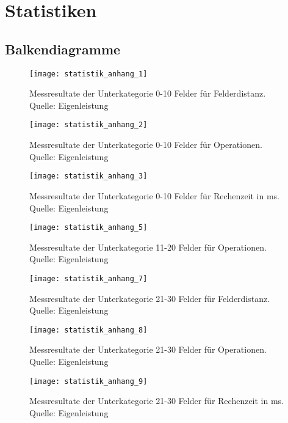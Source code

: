 \section{Statistiken}
\subsection{Balkendiagramme}
\begin{figure}[H]
  \centering
  \texttt{[image: statistik\_anhang\_1]}
  \caption[Messresultate der Unterkategorie 0-10 Felder für Felderdistanz.]{Messresultate der Unterkategorie 0-10 Felder für Felderdistanz. Quelle: Eigenleistung}
\end{figure}
\begin{figure}[H]
  \centering
  \texttt{[image: statistik\_anhang\_2]}
  \caption[Messresultate der Unterkategorie 0-10 Felder für Operationen.]{Messresultate der Unterkategorie 0-10 Felder für Operationen. Quelle: Eigenleistung}
\end{figure}
\begin{figure}[H]
  \centering
  \texttt{[image: statistik\_anhang\_3]}
  \caption[Messresultate der Unterkategorie 0-10 Felder für Rechenzeit in ms.]{Messresultate der Unterkategorie 0-10 Felder für Rechenzeit in ms. Quelle: Eigenleistung}
\end{figure}
\begin{figure}[H]
  \centering
  \texttt{[image: statistik\_anhang\_5]}
  \caption[Messresultate der Unterkategorie 11-20 Felder für Operationen.]{Messresultate der Unterkategorie 11-20 Felder für Operationen. Quelle: Eigenleistung}
\end{figure}
\begin{figure}[H]
  \centering
  \texttt{[image: statistik\_anhang\_7]}
  \caption[Messresultate der Unterkategorie 21-30 Felder für Felderdistanz.]{Messresultate der Unterkategorie 21-30 Felder für Felderdistanz. Quelle: Eigenleistung}
\end{figure}
\begin{figure}[H]
  \centering
  \texttt{[image: statistik\_anhang\_8]}
  \caption[Messresultate der Unterkategorie 21-30 Felder für Operationen.]{Messresultate der Unterkategorie 21-30 Felder für Operationen. Quelle: Eigenleistung}
\end{figure}
\begin{figure}[H]
  \centering
  \texttt{[image: statistik\_anhang\_9]}
  \caption[Messresultate der Unterkategorie 21-30 Felder für Rechenzeit in ms.]{Messresultate der Unterkategorie 21-30 Felder für Rechenzeit in ms. Quelle: Eigenleistung}
\end{figure}
